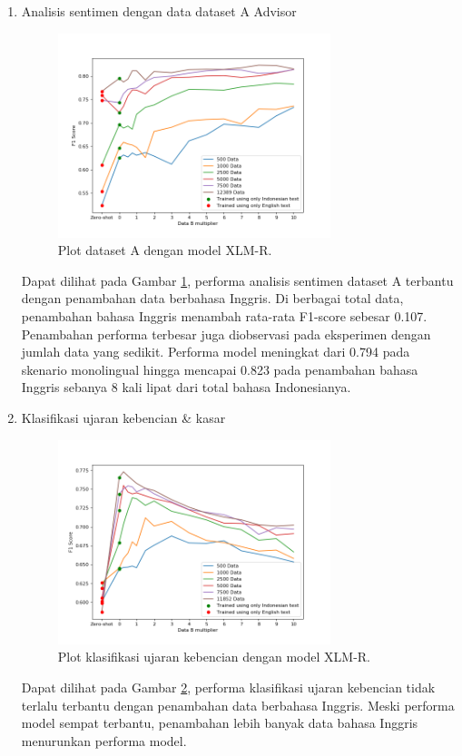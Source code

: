 \begin{enumerate}
            \item Analisis sentimen dengan data dataset A Advisor \\
            \begin{figure}[ht]
                \centering
                \includegraphics[width=0.75\textwidth]{resources/plot-head-trip-xlmr.png}
                \caption{Plot dataset A dengan model XLM-R.}
                \label{fig:plot_head_trip_xlmr}
            \end{figure}
            Dapat dilihat pada Gambar \ref{fig:plot_head_trip_xlmr}, performa analisis sentimen dataset A terbantu dengan penambahan data berbahasa Inggris. Di berbagai total data, penambahan bahasa Inggris menambah rata-rata F1-score sebesar 0.107. Penambahan performa terbesar juga diobservasi pada eksperimen dengan jumlah data yang sedikit. Performa model meningkat dari 0.794 pada skenario monolingual hingga mencapai 0.823 pada penambahan bahasa Inggris sebanya 8 kali lipat dari total bahasa Indonesianya.

            \item Klasifikasi ujaran kebencian \& kasar \\
            \begin{figure}[ht]
                \centering
                \includegraphics[width=0.75\textwidth]{resources/plot-head-toxic-xlmr.png}
                \caption{Plot klasifikasi ujaran kebencian dengan model XLM-R.}
                \label{fig:plot_head_toxic_xlmr}
            \end{figure}
            Dapat dilihat pada Gambar \ref{fig:plot_head_toxic_xlmr}, performa klasifikasi ujaran kebencian tidak terlalu terbantu dengan penambahan data berbahasa Inggris. Meski performa model sempat terbantu, penambahan lebih banyak data bahasa Inggris menurunkan performa model.


\end{enumerate}
